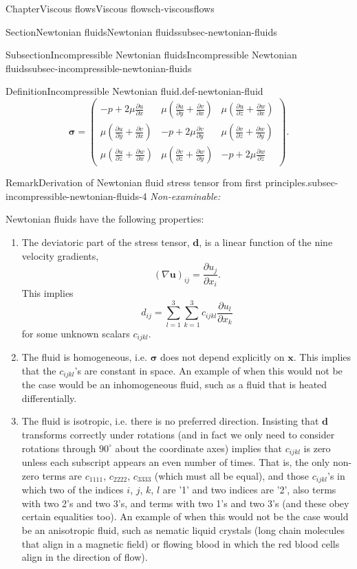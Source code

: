\documentclass[oneside,10pt,]{book}
\numberwithin{equation}{section}
\newcommand{\pd}[2]{\frac{\partial#1}{\partial#2}}
\newcommand{\bx}{\boldsymbol{x}}
\newcommand{\bu}{\boldsymbol{u}}
\newcommand{\bsigma}{\boldsymbol{\sigma}}
\newcommand{\bd}{\boldsymbol{d}}
\begin{document}
\begin{chapterptx}{Chapter}{Viscous flows}{}{Viscous flows}{}{}{ch-viscousflows}
\begin{sectionptx}{Section}{Newtonian fluids}{}{Newtonian fluids}{}{}{subsec-newtonian-fluids}
\begin{subsectionptx}{Subsection}{Incompressible Newtonian fluids}{}{Incompressible Newtonian fluids}{}{}{subsec-incompressible-newtonian-fluids}
\begin{definition}{Definition}{Incompressible Newtonian fluid.}{}{def-newtonian-fluid}
\begin{equation}
\bsigma=\left(\begin{matrix}
-p+2\mu\pd{u}{x}&\mu\left(\pd{u}{y}+\pd{v}{x}\right)&\mu\left(\pd{u}{z}+\pd{w}{x}\right)\\
\mu\left(\pd{u}{y}+\pd{v}{x}\right)&-p+2\mu\pd{v}{y}&\mu\left(\pd{v}{z}+\pd{w}{y}\right)\\
\mu\left(\pd{u}{z}+\pd{w}{x}\right)&\mu\left(\pd{v}{z}+\pd{w}{y}\right)&-p+2\mu\pd{w}{z}
\end{matrix}\right).\label{eq-cartesiannewtonianstress}
\end{equation}
%
\end{definition}
\begin{remark}{Remark}{Derivation of Newtonian fluid stress tensor from first principles.}{subsec-incompressible-newtonian-fluids-4}%
\emph{Non-examinable:}%
\par
Newtonian fluids have the following properties:%
\begin{enumerate}
\item{}The deviatoric part of the stress tensor, \(\bd\), is a linear function of the nine velocity gradients,%
\begin{equation*}
(\nabla\bu)_{ij}=\pd{u_j}{x_i}.
\end{equation*}
This implies%
\begin{equation*}
d_{ij}=\sum_{l=1}^3\sum_{k=1}^3c_{ijkl}\pd{u_l}{x_k}
\end{equation*}
for some unknown scalars \(c_{ijkl}\).%
\item{}The fluid is homogeneous, i.e. \(\bsigma\) does not depend explicitly on \(\bx\). This implies that the \(c_{ijkl}\)'s are constant in space. An example of when this would not be the case would be an inhomogeneous fluid, such as a fluid that is heated differentially.%
\item{}The fluid is isotropic, i.e. there is no preferred direction. Insisting that \(\bd\) transforms correctly under rotations (and in fact we only need to consider rotations through \(90^\circ\) about the coordinate axes) implies that \(c_{ijkl}\) is zero unless each subscript appears an even number of times. That is, the only non-zero terms are \(c_{1111}\), \(c_{2222}\), \(c_{3333}\) (which must all be equal), and those \(c_{ijkl}\)'s in which two of the indices \(i\), \(j\), \(k\), \(l\) are '1' and two indices are '2', also terms with two \textasciigrave{}2's and two \textasciigrave{}3's, and terms with two \textasciigrave{}1's and two \textasciigrave{}3's (and these obey certain equalities too). An example of when this would not be the case would be an anisotropic fluid, such as nematic liquid crystals (long chain molecules that align in a magnetic field) or flowing blood in which the red blood cells align in the direction of flow).%

\end{enumerate}
\end{remark}
\end{subsectionptx}
\end{sectionptx}
\end{chapterptx}
\end{document}
